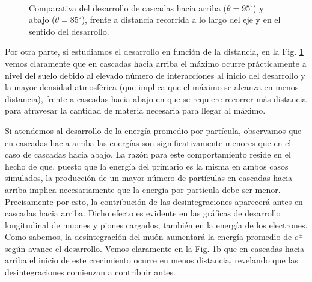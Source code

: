 \documentclass[11 pt, a4paper]{article} %
\numberwithin{equation}{section}
\numberwithin{figure}{section}
\numberwithin{table}{section}
\begin{document}
\begin{figure}[H]
	\centering
	\\
	\caption{Comparativa del desarrollo de cascadas hacia arriba ($\theta = 95^\circ$) y abajo ($\theta=85^\circ$), frente a distancia recorrida a lo largo del eje y en el sentido del desarrollo.}
	\label{comp_ugdg_vsd}
\end{figure}
 Por otra parte, si estudiamos el desarrollo en función de la distancia, en la Fig. \ref{comp_ugdg_vsd} vemos claramente que en cascadas hacia arriba el máximo ocurre prácticamente a nivel del suelo debido al elevado número de interacciones al inicio del desarrollo y la mayor densidad atmosférica (que implica que el máximo se alcanza en menos distancia), frente a cascadas hacia abajo en que se requiere recorrer más distancia para atravesar la cantidad de materia necesaria para llegar al máximo. 

Si atendemos al desarrollo de la energía promedio por partícula, observamos que en cascadas hacia arriba las energías son significativamente menores que en el caso de cascadas hacia abajo. La razón para este comportamiento reside en el hecho de que, puesto que la energía del primario es la misma en ambos casos simulados, la producción de un mayor número de partículas en cascadas hacia arriba implica necesariamente que la energía por partícula debe ser menor. Precisamente por esto, la contribución de las desintegraciones aparecerá antes en cascadas hacia arriba. Dicho efecto es evidente en las gráficas de desarrollo longitudinal de muones y piones cargados, también en la energía de los electrones. Como sabemos, la desintegración del muón aumentará la energía promedio de $e^\pm$ según avance el desarrollo. Vemos claramente en la Fig. \ref{comp_ugdg_vsd}b que en cascadas hacia arriba el inicio de este crecimiento ocurre en menos distancia, revelando que las desintegraciones comienzan a contribuir antes.
\end{document}
